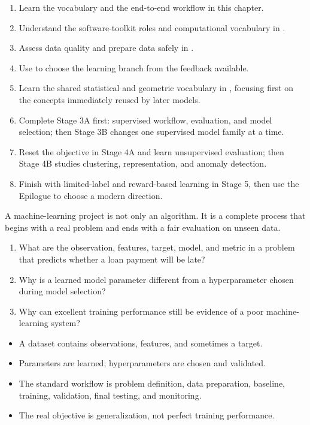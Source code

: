 \begin{enumerate}
  \item Learn the vocabulary and the end-to-end workflow in this chapter.
  \item Understand the software-toolkit roles and computational vocabulary in .
  \item Assess data quality and prepare data safely in .
  \item Use  to choose the learning branch from the feedback available.
  \item Learn the shared statistical and geometric vocabulary in , focusing first on the concepts immediately reused by later models.
  \item Complete Stage 3A first: supervised workflow, evaluation, and model selection; then Stage 3B changes one supervised model family at a time.
  \item Reset the objective in Stage 4A and learn unsupervised evaluation; then Stage 4B studies clustering, representation, and anomaly detection.
  \item Finish with limited-label and reward-based learning in Stage 5, then use the Epilogue to choose a modern direction.
\end{enumerate}

\begin{keyidea}
A machine-learning project is not only an algorithm. It is a complete process that begins with a real problem and ends with a fair evaluation on unseen data.
\end{keyidea}

\begin{quickcheck}
\begin{enumerate}
  \item What are the observation, features, target, model, and metric in a problem that predicts whether a loan payment will be late?
  \item Why is a learned model parameter different from a hyperparameter chosen during model selection?
  \item Why can excellent training performance still be evidence of a poor machine-learning system?
\end{enumerate}
\end{quickcheck}

\begin{chapterrecap}
\begin{itemize}
  \item A dataset contains observations, features, and sometimes a target.
  \item Parameters are learned; hyperparameters are chosen and validated.
  \item The standard workflow is problem definition, data preparation, baseline, training, validation, final testing, and monitoring.
  \item The real objective is generalization, not perfect training performance.
\end{itemize}
\end{chapterrecap}
